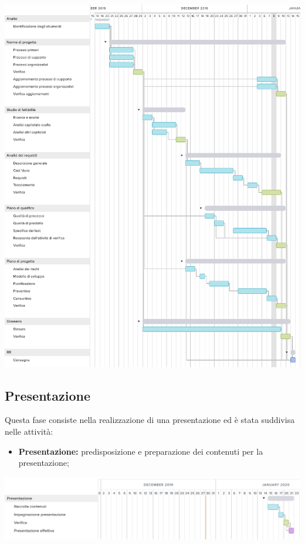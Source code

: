 \includegraphics[width=\textwidth]{res/img/g1113}

\subsection{Presentazione}
Questa fase consiste nella realizzazione di una presentazione ed è stata suddivisa nelle attività:
\begin{itemize}
	\item \textbf{Presentazione:} predisposizione e preparazione dei contenuti per la presentazione;
\end{itemize}
\includegraphics[width=\textwidth]{res/img/g2}

